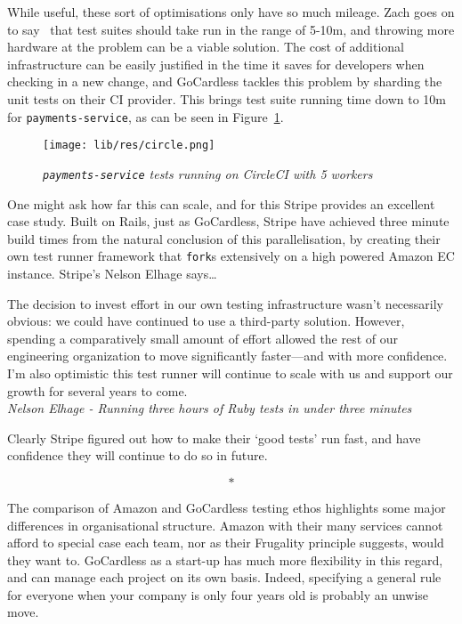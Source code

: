 \documentclass[11pt]{article}
\begin{document}
While useful, these sort of optimisations only have so much mileage. Zach goes
on to say~\cite{howToDeploySoftware} that test suites should take run in the
range of 5-10m, and throwing more hardware at the problem can be a viable
solution. The cost of additional infrastructure can be easily justified in the
time it saves for developers when checking in a new change, and GoCardless
tackles this problem by sharding the unit tests on their CI provider. This
brings test suite running time down to 10m for \texttt{payments-service}, as can
be seen in Figure~\ref{fig:circle}.

\begin{figure}
\centering
\texttt{[image: lib/res/circle.png]}
\caption{\label{fig:circle}\textit{\texttt{payments-service} tests running on
CircleCI with 5 workers}}
\end{figure}

One might ask how far this can scale, and for this Stripe provides an excellent
case study. Built on Rails, just as GoCardless, Stripe have achieved three
minute build times from the natural conclusion of this parallelisation, by
creating their own test runner framework that \texttt{fork}s extensively on a
high powered Amazon EC instance. Stripe's Nelson Elhage says\dots

\begin{displayquote}

  The decision to invest effort in our own testing infrastructure wasn't
  necessarily obvious: we could have continued to use a third-party solution.
  However, spending a comparatively small amount of effort allowed the rest of our
  engineering organization to move significantly faster—and with more confidence.
  I'm also optimistic this test runner will continue to scale with us and support
  our growth for several years to come.\\

  \textit{Nelson Elhage - Running three hours of Ruby tests in under three
  minutes~\cite{stripeDistributedTesting}}

\end{displayquote}

Clearly Stripe figured out how to make their `good tests' run fast, and have
confidence they will continue to do so in future.

\[*\]

The comparison of Amazon and GoCardless testing ethos highlights some major
differences in organisational structure. Amazon with their many services cannot
afford to special case each team, nor as their Frugality principle suggests,
would they want to. GoCardless as a start-up has much more flexibility in this
regard, and can manage each project on its own basis. Indeed, specifying a
general rule for everyone when your company is only four years old is probably
an unwise move.
\end{document}
